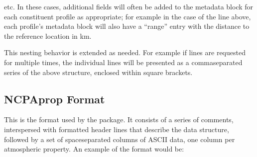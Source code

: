 \documentclass[letterpaper,10pt,english]{sphinxmanual}
\begin{document}
\begin{sphinxVerbatim}[commandchars=\\\{\}]
   
       
       
       
           
           
           
   \PYG{p}{[}
        
        
\end{sphinxVerbatim}

\sphinxAtStartPar
etc.  In these cases, additional fields will often be added to the metadata block for each constituent profile as appropriate; for example in the case of the line above, each profile’s metadata block will also have a “range” entry with the distance to the reference location in km.

\sphinxAtStartPar
This nesting behavior is extended as needed. For example if lines are requested for multiple times, the individual lines will be presented as a comma\sphinxhyphen{}separated series of the above structure, enclosed within square brackets.


\subsection{NCPAprop Format}
\label{\detokenize{formats:ncpaprop-format}}
\sphinxAtStartPar
This is the format used by the  package.  It consists of a series of comments, interspersed with formatted header lines that describe the data structure, followed by a set of space\sphinxhyphen{}separated columns of ASCII data, one column per atmospheric property.  An example of the format would be:
\end{document}
